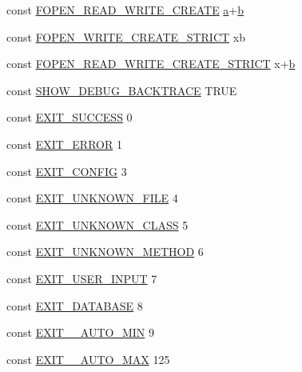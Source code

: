\begin{DoxyCompactItemize}
\item 
const \hyperlink{constants_8php_adcd04289bf4dc262b7652cb4c1eb08f7}{F\+O\+P\+E\+N\+\_\+\+R\+E\+A\+D\+\_\+\+W\+R\+I\+T\+E\+\_\+\+C\+R\+E\+A\+T\+E} \textquotesingle{}\hyperlink{bootstrap_8min_8js_a1f5870dcf487187f13d5fd328ed9e6e7}{a}+\hyperlink{bootstrap_8min_8js_a398bb8542498d1b14178b02b99df309b}{b}\textquotesingle{}
\item 
const \hyperlink{constants_8php_a02007ca17f39af174ac54d30f2ca7e82}{F\+O\+P\+E\+N\+\_\+\+W\+R\+I\+T\+E\+\_\+\+C\+R\+E\+A\+T\+E\+\_\+\+S\+T\+R\+I\+C\+T} \textquotesingle{}xb\textquotesingle{}
\item 
const \hyperlink{constants_8php_a2eeb98a015d74560e9b60ec60d7531d4}{F\+O\+P\+E\+N\+\_\+\+R\+E\+A\+D\+\_\+\+W\+R\+I\+T\+E\+\_\+\+C\+R\+E\+A\+T\+E\+\_\+\+S\+T\+R\+I\+C\+T} \textquotesingle{}x+\hyperlink{bootstrap_8min_8js_a398bb8542498d1b14178b02b99df309b}{b}\textquotesingle{}
\item 
const \hyperlink{constants_8php_a7e2dd6fea73799257285946411aeb5ce}{S\+H\+O\+W\+\_\+\+D\+E\+B\+U\+G\+\_\+\+B\+A\+C\+K\+T\+R\+A\+C\+E} T\+R\+U\+E
\item 
const \hyperlink{constants_8php_a44a73f871298e7befa219da1d96c4bf8}{E\+X\+I\+T\+\_\+\+S\+U\+C\+C\+E\+S\+S} 0
\item 
const \hyperlink{constants_8php_a0072a08da382eee32afd352989a3cfc2}{E\+X\+I\+T\+\_\+\+E\+R\+R\+O\+R} 1
\item 
const \hyperlink{constants_8php_a0c5a2fe588c43f68077982ecc971381e}{E\+X\+I\+T\+\_\+\+C\+O\+N\+F\+I\+G} 3
\item 
const \hyperlink{constants_8php_a9d94a7e06ea3247295ecf2f17f077b77}{E\+X\+I\+T\+\_\+\+U\+N\+K\+N\+O\+W\+N\+\_\+\+F\+I\+L\+E} 4
\item 
const \hyperlink{constants_8php_a7b2af799ecefe2b0471c319bafc26850}{E\+X\+I\+T\+\_\+\+U\+N\+K\+N\+O\+W\+N\+\_\+\+C\+L\+A\+S\+S} 5
\item 
const \hyperlink{constants_8php_aeb461d43337d49e2ba92c555caa8597c}{E\+X\+I\+T\+\_\+\+U\+N\+K\+N\+O\+W\+N\+\_\+\+M\+E\+T\+H\+O\+D} 6
\item 
const \hyperlink{constants_8php_af3a83fa2732cd58b95a81a858b18e4ab}{E\+X\+I\+T\+\_\+\+U\+S\+E\+R\+\_\+\+I\+N\+P\+U\+T} 7
\item 
const \hyperlink{constants_8php_a64406bc73261c35be6e74855a149ad68}{E\+X\+I\+T\+\_\+\+D\+A\+T\+A\+B\+A\+S\+E} 8
\item 
const \hyperlink{constants_8php_adfa393658ac3789382a67aae1519af8f}{E\+X\+I\+T\+\_\+\+\_\+\+A\+U\+T\+O\+\_\+\+M\+I\+N} 9
\item 
const \hyperlink{constants_8php_ac8895d88dadde460367dbf922ddfc194}{E\+X\+I\+T\+\_\+\+\_\+\+A\+U\+T\+O\+\_\+\+M\+A\+X} 125
\end{DoxyCompactItemize}


